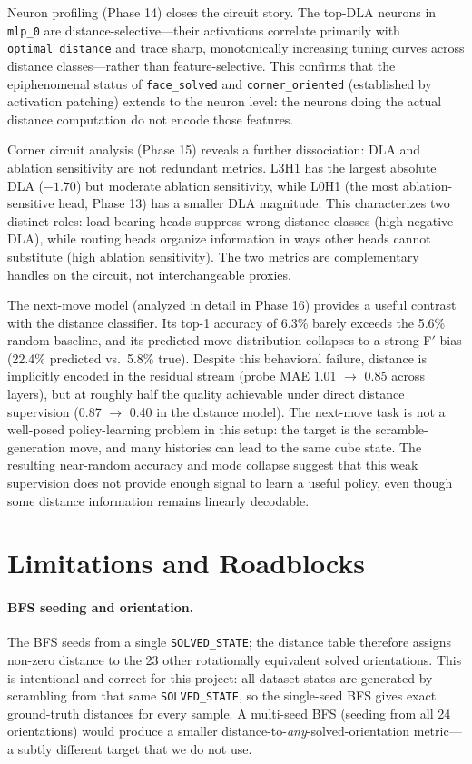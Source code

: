 \documentclass[12pt]{article}
\begin{document}
Neuron profiling (Phase 14) closes the circuit story.  The top-DLA neurons in
\texttt{mlp\_0} are distance-selective---their activations correlate primarily with
\texttt{optimal\_distance} and trace sharp, monotonically increasing tuning curves
across distance classes---rather than feature-selective.  This confirms that the
epiphenomenal status of \texttt{face\_solved} and \texttt{corner\_oriented}
(established by activation patching) extends to the neuron level: the neurons
doing the actual distance computation do not encode those features.

Corner circuit analysis (Phase 15) reveals a further dissociation: DLA and
ablation sensitivity are not redundant metrics.  L3H1 has the largest absolute DLA
($-1.70$) but moderate ablation sensitivity, while L0H1 (the most ablation-sensitive
head, Phase 13) has a smaller DLA magnitude.  This characterizes two distinct roles:
load-bearing heads suppress wrong distance classes (high negative DLA), while routing
heads organize information in ways other heads cannot substitute (high ablation
sensitivity).  The two metrics are complementary handles on the circuit, not
interchangeable proxies.

The next-move model (analyzed in detail in Phase 16) provides a useful contrast
with the distance classifier.  Its top-1 accuracy of 6.3\% barely exceeds the
5.6\% random baseline, and its predicted move distribution collapses to a strong
F$'$ bias (22.4\% predicted vs.\ 5.8\% true).  Despite this behavioral failure,
distance is implicitly encoded in the residual stream (probe MAE 1.01 $\to$ 0.85
across layers), but at roughly half the quality achievable under direct distance
supervision (0.87 $\to$ 0.40 in the distance model).  The next-move task is not a well-posed policy-learning problem in this setup:
the target is the scramble-generation move, and many histories can lead to the
same cube state.  The resulting near-random accuracy and mode collapse suggest
that this weak supervision does not provide enough signal to learn a useful
policy, even though some distance information remains linearly decodable.

\section{Limitations and Roadblocks}

\paragraph{BFS seeding and orientation.}
The BFS seeds from a single \texttt{SOLVED\_STATE}; the distance table therefore
assigns non-zero distance to the 23 other rotationally equivalent solved
orientations.  This is intentional and correct for this project: all dataset
states are generated by scrambling from that same \texttt{SOLVED\_STATE}, so the
single-seed BFS gives exact ground-truth distances for every sample.  A
multi-seed BFS (seeding from all 24 orientations) would produce a smaller
distance-to-\emph{any}-solved-orientation metric---a subtly different target
that we do not use.
\end{document}
